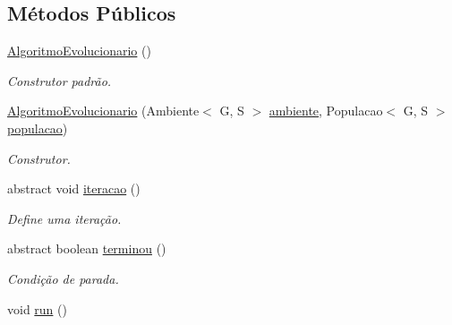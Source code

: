 \subsection*{Métodos Públicos}
\begin{DoxyCompactItemize}
\item 
\hyperlink{classic_1_1populacional_1_1algoritmo_1_1_algoritmo_evolucionario_3_01_g_01extends_01_number_00_0bd52af860edf752f8985460efb0aa102_a1eb9a5f562149136fc5fe4171efa52f3}{Algoritmo\-Evolucionario} ()
\begin{DoxyCompactList}\small\item\em Construtor padrão. \end{DoxyCompactList}\item 
\hyperlink{classic_1_1populacional_1_1algoritmo_1_1_algoritmo_evolucionario_3_01_g_01extends_01_number_00_0bd52af860edf752f8985460efb0aa102_aac30d461810834d3b43de32b39b19cba}{Algoritmo\-Evolucionario} (Ambiente$<$ G, S $>$ \hyperlink{classic_1_1populacional_1_1algoritmo_1_1_algoritmo_evolucionario_3_01_g_01extends_01_number_00_0bd52af860edf752f8985460efb0aa102_ad149586d38a1ad23204c414710203988}{ambiente}, Populacao$<$ G, S $>$ \hyperlink{classic_1_1populacional_1_1algoritmo_1_1_algoritmo_evolucionario_3_01_g_01extends_01_number_00_0bd52af860edf752f8985460efb0aa102_ae8aa62f99168ff5609d3c0a74a0b71de}{populacao})
\begin{DoxyCompactList}\small\item\em Construtor. \end{DoxyCompactList}\item 
abstract void \hyperlink{classic_1_1populacional_1_1algoritmo_1_1_algoritmo_evolucionario_3_01_g_01extends_01_number_00_0bd52af860edf752f8985460efb0aa102_ac7ec720389957da6b0c673e41eb4835d}{iteracao} ()
\begin{DoxyCompactList}\small\item\em Define uma iteração. \end{DoxyCompactList}\item 
abstract boolean \hyperlink{classic_1_1populacional_1_1algoritmo_1_1_algoritmo_evolucionario_3_01_g_01extends_01_number_00_0bd52af860edf752f8985460efb0aa102_a21c68d39ea1b14d8c893dfd0d5879f48}{terminou} ()
\begin{DoxyCompactList}\small\item\em Condição de parada. \end{DoxyCompactList}\item 
void \hyperlink{classic_1_1populacional_1_1algoritmo_1_1_algoritmo_evolucionario_3_01_g_01extends_01_number_00_0bd52af860edf752f8985460efb0aa102_a8b7d74acab2270a549efb7d402c4586f}{run} ()

\end{DoxyCompactItemize}
